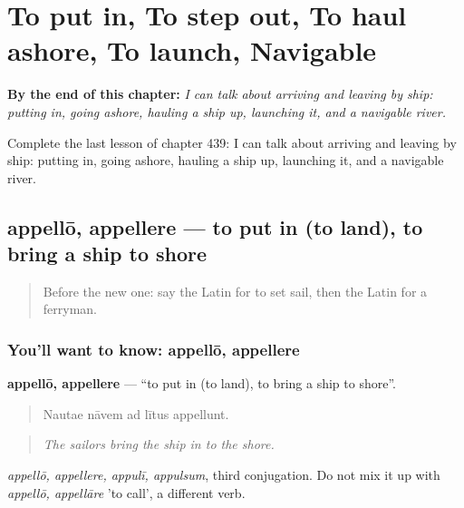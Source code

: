 
\chapter{To put in, To step out, To haul ashore, To launch, Navigable}
\label{ch:la-to-put-in-to-step-out-to-haul-ashore-to-launch-navigable}

\begin{chapteropening}
\textbf{By the end of this chapter:} \emph{I can talk about arriving and leaving by ship: putting in, going ashore, hauling a ship up, launching it, and a navigable river.}

Complete the last lesson of chapter 439: I can talk about arriving and leaving by ship: putting in, going ashore, hauling a ship up, launching it, and a navigable river.
\end{chapteropening}

\section[appellō, appellere]{appellō, appellere — to put in (to land), to bring a ship to shore}

\label{lesson:LA-C439-appello}



\begin{quote}
Before the new one: say the Latin for to set sail, then the Latin for a ferryman.
\end{quote}

\subsection*{You'll want to know: appellō, appellere}
\textbf{appellō, appellere} — \textquotedblleft{}to put in (to land), to bring a ship to shore\textquotedblright{}.

\begin{quote}
Nautae nāvem ad lītus appellunt.
\end{quote}

\begin{quote}
\emph{The sailors bring the ship in to the shore.}
\end{quote}

\emph{appellō, appellere, appulī, appulsum}, third conjugation. Do not mix it up with \emph{appellō, appellāre} 'to call', a different verb.

